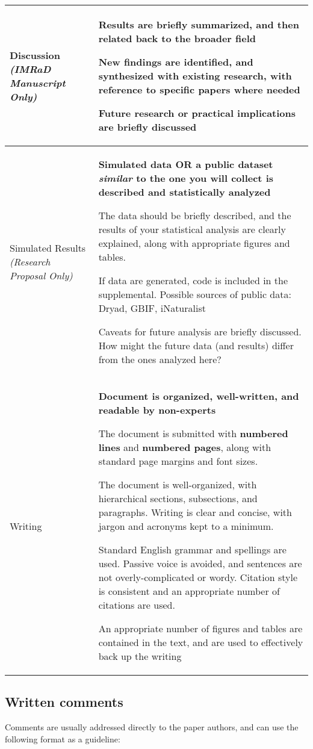 \documentclass[11pt]{article}
\newcommand{\tabit}{\scriptsize\par\textbullet\phantom{ }}
\begin{document}
\begin{table}[h!]
\begin{tabular}{p{3cm}|p{12cm}}
Discussion \small\emph{(IMRaD Manuscript Only)} & \textbf{Results are briefly summarized, and then related back to the broader field}
\tabit New findings are identified, and synthesized with existing research, with reference to specific papers where needed
\tabit Future research or practical implications are briefly discussed \\ \hline

Simulated Results \small\emph{(Research Proposal Only)} & \textbf{Simulated data \textbf{OR} a public dataset \emph{similar} to the one you will collect is described and statistically analyzed}
\tabit The data should be briefly described, and the results of your statistical analysis are clearly explained, along with appropriate figures and tables.
\tabit If data are generated, code is included in the supplemental. Possible sources of public data: Dryad, GBIF, iNaturalist  
\tabit Caveats for future analysis are briefly discussed. How might the future data (and results) differ from the ones analyzed here?  

\\ \hline

Writing & \textbf{Document is organized, well-written, and readable by non-experts}
  \tabit The document is submitted with \textbf{numbered lines} and \textbf{numbered pages}, along with standard page margins and font sizes. 
  \tabit The document is well-organized, with hierarchical sections, subsections, and paragraphs. Writing is clear and concise, with jargon and acronyms kept to a minimum.
  \tabit Standard English grammar and spellings are used. Passive voice is avoided, and sentences are not overly-complicated or wordy. Citation style is consistent and an appropriate number of citations are used.
  \tabit An appropriate number of figures and tables are contained in the text, and are used to effectively back up the writing \\

\end{tabular}
\end{table}

\subsection*{Written comments}

Comments are usually addressed directly to the paper authors, and can use the following format as a guideline:
\end{document}
